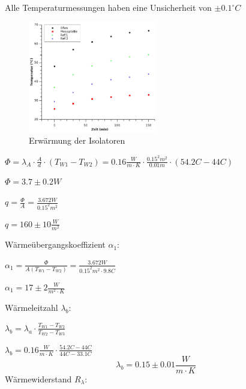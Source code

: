 \documentclass[12pt,a4paper,twopage]{article}
\begin{document}
Alle Temperaturmessungen haben eine Unsicherheit von $\pm 0.1 ^\circ C$

\begin{figure}
\begin{center}
\includegraphics[width=0.5\textwidth]{isol.eps}
\caption{Erwärmung der Isolatoren}
\end{center}
\end{figure}

\( \Phi = \lambda_A \cdot \frac{A}{d} \cdot (T_{W1}-T_{W2}) = 0.16 \frac{W}{m\cdot K} \cdot \frac{0.15^2 m^2}{0.01m} \cdot (54.2 C - 44 C) \)

\begin{center}
\( \boxed{ \Phi = 3.7 \pm 0.2 W }\) 
\end{center}



\( q = \frac{\Phi}{A} = \frac{3.672W}{0.15^2 m^2} \)

\begin{center}
\( \boxed{ q =160 \pm 10 \frac{W}{m^2}} \)
\end{center}

\pagebreak

Wärmeübergangskoeffizient $\alpha_1$:

\( \alpha_1 = \frac{\Phi}{A(T_{W1}-T_{W2})} = \frac{3.672W}{0.15^2 m^2 \cdot 9.8C} \) 

\begin{center}
\(\boxed{ \alpha_1 = 17 \pm 2 \frac{W}{m^{2} \cdot K} } \)
\end{center}


Wärmeleitzahl $\lambda_b$:


\(\lambda_b = \lambda_a \cdot \frac{T_{W1}-T_{W2}}{T_{W2}-T_{W3}} \)

\( \lambda_b = 0.16\frac{W}{m\cdot K} \cdot \frac{54.2C-44C}{44C-33.1C} \)
\begin{equation}
\boxed{ \lambda_b=  0.15 \pm 0.01 \frac{W}{m\cdot K} } 
\label{lambdab}
\end{equation}
Wärmewiderstand $R_\lambda$:
\end{document}
